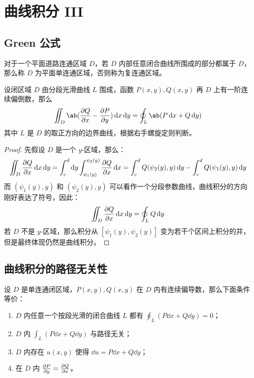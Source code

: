 \section{曲线积分 III}

\subsection{Green 公式}

\begin{definition}
	对于一个平面道路连通区域 $D$，若 $D$ 内部任意闭合曲线所围成的部分都属于 $D$，那么称 $D$ 为平面单连通区域，否则称为复连通区域。
\end{definition}

\begin{theorem}
	设闭区域 $D$ 由分段光滑曲线 $L$ 围成，函数 $P(x, y), Q(x, y)$ 再 $D$ 上有一阶连续偏倒数，那么
	$$
	\iint_D \ab(\pdv{Q}{x} - \pdv{P}{y}) \dd{x} \dd{y} = \oint_L \ab(P \dd{x} + Q \dd{y})
	$$
	其中 $L$ 是 $D$ 的取正方向的边界曲线，根据右手螺旋定则判断。

	\begin{proof}
		先假设 $D$ 是一个 $y$-区域，那么：
		$$
		\iint_D \pdv{Q}{x} \dd{x} \dd{y} = \int_{c}^{d} \dd{y} \int_{\psi_1(y)}^{\psi_2(y)} \pdv{Q}{x} \dd{x} = \int_{c}^{d} Q(\psi_2(y), y) \dd{y} - \int_{c}^{d} Q(\psi_1(y), y) \dd{y}
		$$
		而 $(\psi_1(y), y)$ 和 $(\psi_2(y), y)$ 可以看作一个分段参数曲线，曲线积分的方向刚好表达了符号，因此：
		$$
		\iint_D \pdv{Q}{x} \dd{x} \dd{y} = \oint_L Q \dd{y}
		$$
		若 $D$ 不是 $y$-区域，那么积分从 $[\psi_1(y), \psi_2(y)]$ 变为若干个区间上积分的并，但是最终体现仍然是曲线积分。
	\end{proof}
\end{theorem}

\subsection{曲线积分的路径无关性}

\begin{theorem}
	设 $D$ 是单连通闭区域，$P(x, y), Q(x, y)$ 在 $D$ 内有连续偏导数，那么下面条件等价：
	\begin{enumerate}
		\item $D$ 内任意一个按段光滑的闭合曲线 $L$ 都有 $\displaystyle \oint_L (P \dd{x} + Q \dd{y}) = 0$；
		\item $D$ 内 $\displaystyle \int_L (P \dd{x} + Q \dd{y})$ 与路径无关；
		\item $D$ 内存在 $u(x, y)$ 使得 $\dd{u} = P \dd{x} + Q \dd{y}$；
		\item 在 $D$ 内 $\pdv{P}{y} = \pdv{Q}{x}$。
	\end{enumerate}
\end{theorem}